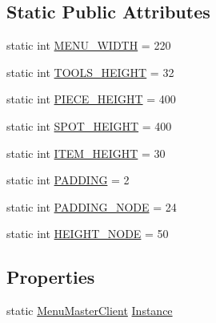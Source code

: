 \subsection*{Static Public Attributes}
\begin{DoxyCompactItemize}
\item 
static int \hyperlink{classgearit_1_1src_1_1_menu_master_client_a110b9a95cff9d5765e1a57f2495ab6f6}{M\+E\+N\+U\+\_\+\+W\+I\+D\+T\+H} = 220
\item 
static int \hyperlink{classgearit_1_1src_1_1_menu_master_client_a09b6a42eb239c54a1dd0460798a436bf}{T\+O\+O\+L\+S\+\_\+\+H\+E\+I\+G\+H\+T} = 32
\item 
static int \hyperlink{classgearit_1_1src_1_1_menu_master_client_a57d794e621bf08913d7c7779737a7d1f}{P\+I\+E\+C\+E\+\_\+\+H\+E\+I\+G\+H\+T} = 400
\item 
static int \hyperlink{classgearit_1_1src_1_1_menu_master_client_a3acfff33abfd33346198d950af0511ae}{S\+P\+O\+T\+\_\+\+H\+E\+I\+G\+H\+T} = 400
\item 
static int \hyperlink{classgearit_1_1src_1_1_menu_master_client_a94304d45bbdd0f58ab7610eeaca3408f}{I\+T\+E\+M\+\_\+\+H\+E\+I\+G\+H\+T} = 30
\item 
static int \hyperlink{classgearit_1_1src_1_1_menu_master_client_a9e18bded10c52687580065b3f3168afa}{P\+A\+D\+D\+I\+N\+G} = 2
\item 
static int \hyperlink{classgearit_1_1src_1_1_menu_master_client_a27fcad719a8fb13846f4bba86941d0f5}{P\+A\+D\+D\+I\+N\+G\+\_\+\+N\+O\+D\+E} = 24
\item 
static int \hyperlink{classgearit_1_1src_1_1_menu_master_client_ac21408cd0544215dec019ee9e796064b}{H\+E\+I\+G\+H\+T\+\_\+\+N\+O\+D\+E} = 50
\end{DoxyCompactItemize}
\subsection*{Properties}
\begin{DoxyCompactItemize}
\item 
static \hyperlink{classgearit_1_1src_1_1_menu_master_client}{Menu\+Master\+Client} \hyperlink{classgearit_1_1src_1_1_menu_master_client_a95cbf45df8084be23cafb1ab1ddf1a2a}{Instance}
\end{DoxyCompactItemize}



